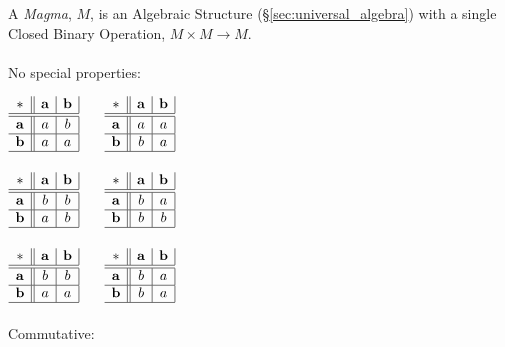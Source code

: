 A \emph{Magma}, $M$, is an Algebraic Structure
(\S\ref{sec:universal_algebra}) with a single Closed Binary Operation,
$M \times M \rightarrow M$.
\\ \\
No special properties:

$\begin{array}{c||c|c|}
  * & \mathbf{a} & \mathbf{b} \\ \hline \hline
  \mathbf{a} & a & b \\ \hline
  \mathbf{b} & a & a \\ \hline
\end{array}$ $\quad$ $\begin{array}{c||c|c|}
  * & \mathbf{a} & \mathbf{b} \\ \hline \hline
  \mathbf{a} & a & a \\ \hline
  \mathbf{b} & b & a \\ \hline
\end{array}$ \\ \hfill \\

$\begin{array}{c||c|c|}
  * & \mathbf{a} & \mathbf{b} \\ \hline \hline
  \mathbf{a} & b & b \\ \hline
  \mathbf{b} & a & b \\ \hline
\end{array}$ $\quad$ $\begin{array}{c||c|c|}
  * & \mathbf{a} & \mathbf{b} \\ \hline \hline
  \mathbf{a} & b & a \\ \hline
  \mathbf{b} & b & b \\ \hline
\end{array}$ \\ \hfill \\

$\begin{array}{c||c|c|}
  * & \mathbf{a} & \mathbf{b} \\ \hline \hline
  \mathbf{a} & b & b \\ \hline
  \mathbf{b} & a & a \\ \hline
\end{array}$ $\quad$ $\begin{array}{c||c|c|}
  * & \mathbf{a} & \mathbf{b} \\ \hline \hline
  \mathbf{a} & b & a \\ \hline
  \mathbf{b} & b & a \\ \hline
\end{array}$
\\ \\
Commutative:

